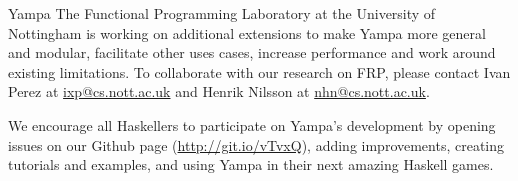\begin{hcarentry}[updated]{Yampa}
The Functional Programming Laboratory at the University of Nottingham is
working on additional extensions to make Yampa more general and modular,
facilitate other uses cases, increase performance and work around existing
limitations. To collaborate with our research on FRP, please contact Ivan Perez
at \href{mailto:ixp@cs.nott.ac.uk}{ixp@cs.nott.ac.uk} and Henrik Nilsson at
\href{mailto:nhn@cs.nott.ac.uk}{nhn@cs.nott.ac.uk}.

We encourage all Haskellers to participate on Yampa's development by opening
issues on our Github page (\href{http://git.io/vTvxQ}{http://git.io/vTvxQ}),
adding improvements, creating tutorials and examples, and using Yampa in their
next amazing Haskell games.


\end{hcarentry}
